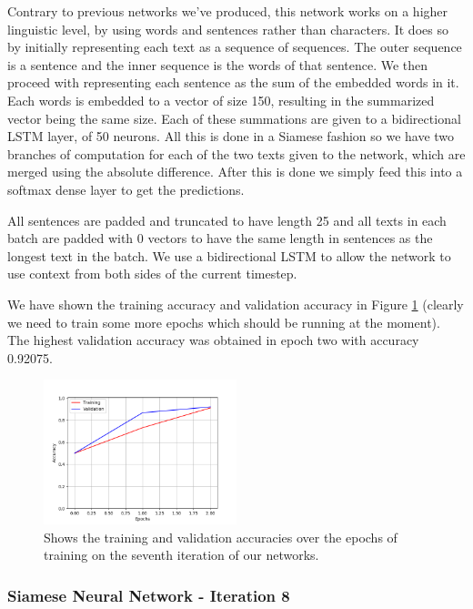 Contrary to previous networks we've produced, this network works on a higher
linguistic level, by using words and sentences rather than characters. It does
so by initially representing each text as a sequence of sequences. The outer
sequence is a sentence and the inner sequence is the words of that sentence.
We then proceed with representing each sentence as the sum of the embedded
words in it. Each words is embedded to a vector of size 150, resulting in the
summarized vector being the same size. Each of these summations are given to a
bidirectional \gls{LSTM} layer, of 50 neurons. All this is done in a Siamese
fashion so we have two branches of computation for each of the two texts given
to the network, which are merged using the absolute difference. After this is
done we simply feed this into a softmax dense layer to get the predictions.

All sentences are padded and truncated to have length 25 and all texts in each
batch are padded with 0 vectors to have the same length in sentences as the
longest text in the batch. We use a bidirectional \gls{LSTM} to allow the
network to use context from both sides of the current timestep.

We have shown the training accuracy and validation accuracy in Figure
\ref{fig:network_7_accuracies} (clearly we need to train some more epochs which
should be running at the moment). The highest validation accuracy was obtained
in epoch two with accuracy 0.92075.

\begin{figure}
    \centering
    \includegraphics[width=0.5\textwidth]{./pictures/experiments/network_7_accuracies.png}
    \caption{Shows the training and validation accuracies over the epochs of
        training on the seventh iteration of our networks.}
    \label{fig:network_7_accuracies}
\end{figure}


\subsubsection{Siamese Neural Network - Iteration 8}

